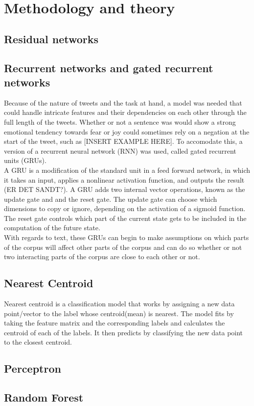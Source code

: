 
\section{Methodology and theory}

\subsection{Residual networks}

\subsection{Recurrent networks and gated recurrent networks}
Because of the nature of tweets and the task at hand, a model was needed that could handle intricate features and their dependencies on each other through the full length of the tweets. Whether or not a sentence was would show a strong emotional tendency towards fear or joy could sometimes rely on a negation at the start of the tweet, such as  [INSERT EXAMPLE HERE]. To accomodate this, a version of a recurrent neural network (RNN) was used, called gated recurrent units (GRUs).\\
A GRU is a modification of the standard unit in a feed forward network, in which it takes an input, applies a nonlinear activation function, and outputs the result (ER DET SANDT?). A GRU adds two internal vector operations, known as the update gate and and the reset gate. The update gate can choose which dimensions to copy or ignore, depending on the activation of a sigmoid function. The reset gate controls which part of the current state gets to be included in the computation of the future state.\\
With regards to text, these GRUs can begin to make assumptions on which parts of the corpus will affect other parts of the corpus and can do so whether or not two interacting parts of the corpus are close to each other or not.
\subsection{Nearest Centroid}
Nearest centroid is a classification model that works by assigning a new data point/vector to the label whose centroid(mean) is nearest. The model fits by taking the feature matrix and the corresponding labels and calculates the centroid of each of the labels. It then predicts by classifying the new data point to the closest centroid.
\subsection{Perceptron}
\subsection{Random Forest}
